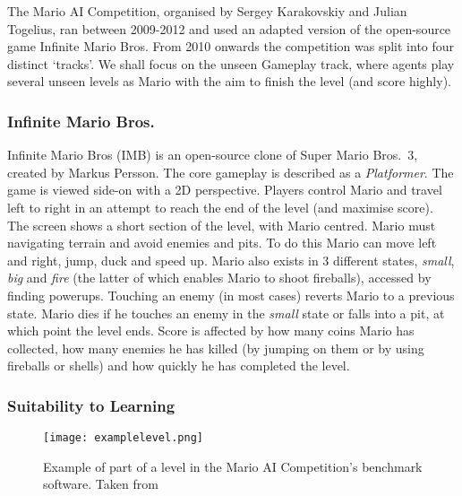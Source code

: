 The Mario AI Competition, organised by Sergey Karakovskiy and Julian Togelius, ran between 2009-2012 and used an adapted version of the open-source game Infinite Mario Bros. From 2010 onwards the competition was split into four distinct `tracks'. We shall focus on the unseen Gameplay track, where agents play several unseen levels as Mario with the aim to finish the level (and score highly). \cite{marioaicomp} \cite{2012the}

\subsubsection*{\hspace{6pt}Infinite Mario Bros.}

Infinite Mario Bros (IMB) \cite{imb} is an open-source clone of Super Mario Bros.~3, created by Markus Persson. The core gameplay is described as a \emph{Platformer}. The game is viewed side-on with a 2D perspective. Players control Mario and travel left to right in an attempt to reach the end of the level (and maximise score). The screen shows a short section of the level, with Mario centred. Mario must navigating terrain and avoid enemies and pits. To do this Mario can move left and right, jump, duck and speed up. Mario also exists in 3 different states, \emph{small}, \emph{big} and \emph{fire} (the latter of which enables Mario to shoot fireballs), accessed by finding powerups. Touching an enemy (in most cases) reverts Mario to a previous state. Mario dies if he touches an enemy in the \emph{small} state or falls into a pit, at which point the level ends. Score is affected by how many coins Mario has collected, how many enemies he has killed (by jumping on them or by using fireballs or shells) and how quickly he has completed the level. \cite[p.~3]{2012the}

\subsubsection*{\hspace{6pt}Suitability to Learning}

\begin{figure}[t]
	\begin{adjustwidth}{-0cm}{-0cm}
    \centering
    \texttt{[image: examplelevel.png]}
    \caption{Example of part of a level in the Mario AI Competition's benchmark software. Taken from \cite[p.~6]{2012the}}
    \label{fig:xmpllevel}
    \end{adjustwidth}
\end{figure}

